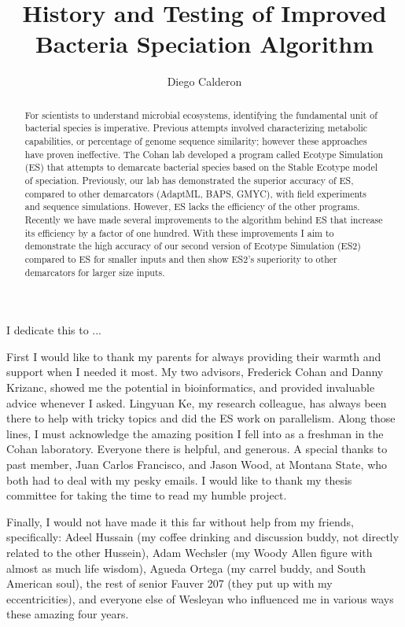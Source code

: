 \documentclass[11pt, final]{westhesis}
\title{History and Testing of Improved Bacteria Speciation Algorithm}
\author{Diego Calderon}
\begin{document}

\begin{dedication}
I dedicate this to ...
\end{dedication}

\begin{acknowledgements}
First I would like to thank my parents for always providing their warmth and support when I needed it most.
My two advisors, Frederick Cohan and Danny Krizanc, showed me the potential in bioinformatics, and provided invaluable advice whenever I asked.
Lingyuan Ke, my research colleague, has always been there to help with tricky topics and did the ES work on parallelism.
Along those lines, I must acknowledge the amazing position I fell into as a freshman in the Cohan laboratory.
Everyone there is helpful, and generous.
A special thanks to past member, Juan Carlos Francisco, and Jason Wood, at Montana State, who both had to deal with my pesky emails.
I would like to thank my thesis committee for taking the time to read my humble project.

Finally, I would not have made it this far without help from my friends, specifically: Adeel Hussain (my coffee drinking and discussion buddy, not directly related to the other Hussein), Adam Wechsler (my Woody Allen figure with almost as much life wisdom), Agueda Ortega (my carrel buddy,  and South American soul), the rest of senior Fauver 207 (they put up with my eccentricities), and everyone else of Wesleyan who influenced me in various ways these amazing four years.
\end{acknowledgements}


\begin{abstract}
For scientists to understand microbial ecosystems, identifying the fundamental unit of bacterial species is imperative.
Previous attempts involved characterizing metabolic capabilities, or percentage of genome sequence similarity; however these approaches have proven ineffective.
The Cohan lab developed a program called Ecotype Simulation (ES) that attempts to demarcate bacterial species based on the Stable Ecotype model of speciation.
Previously, our lab has demonstrated the superior accuracy of ES, compared to other demarcators (AdaptML, BAPS, GMYC), with field experiments and sequence simulations.
However, ES lacks the efficiency of the other programs.
Recently we have made several improvements to the algorithm behind ES that increase its efficiency by a factor of one hundred.
With these improvements I aim to demonstrate the high accuracy of our second version of Ecotype Simulation (ES2) compared to ES for smaller inputs and then show ES2's superiority to other demarcators for larger size inputs.
\end{abstract}
\end{document}
